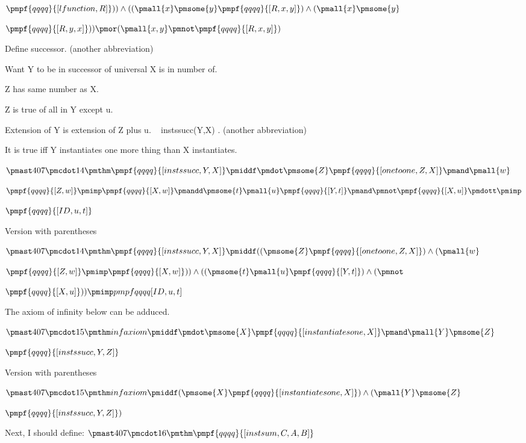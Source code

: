 \documentclass[12pt]{article}
\begin{document}
$\pmpf{qqqq}{[lfunction, R]} )) \land (( \pmall{x} \pmsome{y} \pmpf{qqqq}{[R,x,y]} ) \land ( \pmall{x} \pmsome{y} $

$\pmpf{qqqq}{[R,y,x]}  )) \pmor (  \pmall{x,y} \pmnot \pmpf{qqqq}{[R,x,y]})$


Define successor. (another abbreviation)

Want Y to be in successor of universal X is in number of.

Z has same number as X.

Z is true of all in Y except u.

Extension of Y is extension of Z plus u.
 
instssucc(Y,X) . (another abbreviation)

It is true iff Y instantiates one more thing than X instantiates. 

$\pmast 407 \pmcdot 14 \pmthm \pmpf{qqqq}{[instssucc, Y, X]} \pmiddf \pmdot \pmsome{Z} \pmpf{qqqq}{[onetoone, Z, X]} \pmand \pmall{w} $

$\pmpf{qqqq}{[Z,w]} \pmimp \pmpf{qqqq}{[X, w]} \pmandd \pmsome{t} \pmall{u} \pmpf{qqqq}{[Y,t]} \pmand \pmnot \pmpf{qqqq}{[X, u]} \pmdott \pmimp $

$\pmpf{qqqq}{[ID, u, t]} $
 
 

Version with parentheses

$\pmast 407 \pmcdot 14 \pmthm \pmpf{qqqq}{[instssucc, Y, X]} \pmiddf  ((  \pmsome{Z} \pmpf{qqqq}{[onetoone, Z, X]} ) \land ( \pmall{w} $

$\pmpf{qqqq}{[Z,w]} \pmimp \pmpf{qqqq}{[X, w]} )) \land (( \pmsome{t} \pmall{u} \pmpf{qqqq}{[Y,t]} ) \land ( \pmnot $

$\pmpf{qqqq}{[X, u]}  )) \pmimp  pmpf{qqqq}{[ID, u, t]} $


The axiom of infinity below can be adduced.


$\pmast 407 \pmcdot 15 \pmthm infaxiom \pmiddf \pmdot \pmsome{X} \pmpf{qqqq}{[instantiatesone, X]} \pmand \pmall{Y} \pmsome{Z} $

$\pmpf{qqqq}{[instssucc, Y, Z]}$
 
 

Version with parentheses

$\pmast 407 \pmcdot 15 \pmthm infaxiom \pmiddf  (  \pmsome{X} \pmpf{qqqq}{[instantiatesone, X]} ) \land ( \pmall{Y} \pmsome{Z} $

$\pmpf{qqqq}{[instssucc, Y, Z]})$


  
Next, I should define:
$\pmast 407 \pmcdot 16 \pmthm \pmpf{qqqq}{[instsum, C, A, B]}$
\end{document}
